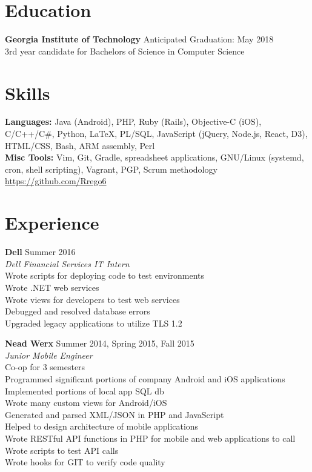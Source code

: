 \documentclass[line, margin]{res}
\begin{document}

\address{402 Roberts Way\\Rincon, GA 31326\\ (912) 346 6060\\ \href{mailto:rrego@gatech.edu}{\textbf{rrego@gatech.edu}}}

\begin{resume}

\section{Education}
\textbf{Georgia Institute of Technology} \hfill Anticipated Graduation: May 2018 \\
3rd year candidate for Bachelors of Science in Computer Science

\section{Skills}
\textbf{Languages:} Java (Android), PHP, Ruby (Rails), Objective-C (iOS), C/C++/C\#, Python, LaTeX, PL/SQL, JavaScript (jQuery, Node.js, React, D3), HTML/CSS, Bash, ARM assembly, Perl \\
\textbf{Misc Tools:} Vim, Git, Gradle, spreadsheet applications, GNU/Linux (systemd, cron, shell scripting), Vagrant, PGP, Scrum methodology\\
\url{https://github.com/Rrego6}

\section{Experience}
\textbf{Dell} \hfill Summer 2016 \\
\textit{Dell Financial Services IT Intern} \\
Wrote scripts for deploying code to test environments \\
Wrote .NET web services \\
Wrote views for developers to test web services \\
Debugged and resolved database errors \\
Upgraded legacy applications to utilize TLS 1.2

\textbf{Nead Werx} \hfill Summer 2014, Spring 2015, Fall 2015 \\
\textit{Junior Mobile Engineer} \\
Co-op for 3 semesters \\
Programmed significant portions of company Android and iOS applications \\
Implemented portions of local app SQL db \\
Wrote many custom views for Android/iOS \\
Generated and parsed XML/JSON in PHP and JavaScript \\
Helped to design architecture of mobile applications\\
Wrote RESTful API functions in PHP for mobile and web applications to call \\
Wrote scripts to test API calls \\
Wrote hooks for GIT to verify code quality


\end{resume}
\end{document}

